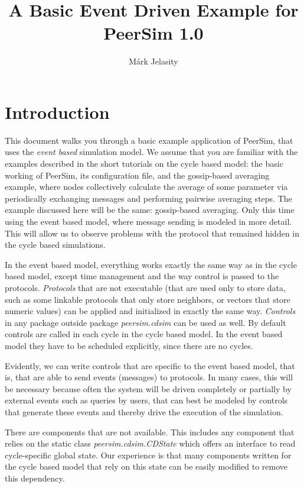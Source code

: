 \documentclass[a4paper,11pt]{article}
\title{A Basic Event Driven Example for PeerSim 1.0}
\author{M\'ark Jelasity}
\begin{document}
\maketitle

\section{Introduction}

This document walks you through a basic example application of PeerSim,
that uses the \emph{event based} simulation model.
We assume that you are familiar with the examples described in
the short tutorials on the cycle based model: the basic working
of PeerSim, its configuration file, and the gossip-based averaging example,
where nodes collectively calculate the average of some parameter via
periodically exchanging messages and performing pairwise averaging steps.
The example discussed here will be the same: gossip-based averaging.
Only this time using the event based model, where message sending is modeled
in more detail.
This will allow us to observe problems with the protocol that remained hidden
in the cycle based simulations.

In the event based model, everything works exactly the same way as in the
cycle based model, except time management and the way control is passed to
the protocols.
\emph{Protocols} that are not executable (that are used only to store
data, such as some linkable protocols that only store neighbors, or vectors that
store numeric values) can be applied and initialized in exactly the same way.
\emph{Controls} in any package outside package \emph{peersim.cdsim} can
be used as well. By default controls are called in each cycle in the cycle
based model. In the event based model they have to be scheduled explicitly,
since there are no cycles.

Evidently, we can write controls that are specific to the event based model,
that is, that are able to send events (messages) to protocols.
In many cases, this will be necessary because often the system will be
driven completely or partially by external events such as queries by users,
that can best be
modeled by controls that generate these events and thereby drive the
execution of the simulation.

There are components that are not available.
This includes any component that relies on the static class
\emph{peersim.cdsim.CDState} which offers an interface to read cycle-specific
global state.
Our experience is that many components written for the cycle based model
that rely on this state can be easily modified to remove this dependency.
\end{document}
